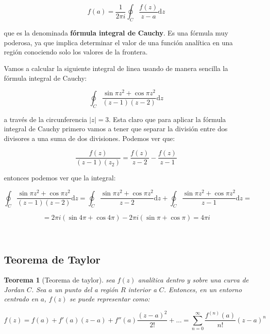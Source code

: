 \documentclass[12pt,a4paper]{book}
\newcommand{\D}{\mathrm{d}}
\newtheorem{theorem}{Teorema}[section]
\begin{document}
\begin{equation}
f(a) =  \frac{1}{2 \pi i} \oint_C \frac{f(z)}{z-a} \D z
\end{equation}

que es la denominada \textbf{fórmula integral de Cauchy}. Es una fórmula muy poderosa, ya que implica determinar el valor de una función analítica en una región conociendo solo los valores de la frontera. \\



\hrulefill

Vamos a calcular la siguiente integral de linea usando de manera sencilla la fórmula integral de Cauchy:

\begin{equation}
\oint_C  \frac{\sin \pi z^2 + \cos \pi z^2}{(z-1)(z-2)} \D z
\end{equation}

a través de la circunferencia $|z| = 3$. Esta claro que para aplicar la fórmula integral de Cauchy primero vamos a tener que separar la división entre dos divisores a una suma de dos divisiones. Podemos ver que:

$$ \dfrac{f(z)}{(z-1)(z_2)} = \dfrac{f(z)}{z-2} - \dfrac{f(z)}{z-1} $$


entonces podemos ver que la integral:

$$  
\oint_C  \frac{\sin \pi z^2 + \cos \pi z^2}{(z-1)(z-2)} \D z  = 
\oint_C  \frac{\sin \pi z^2 + \cos \pi z^2}{z-2} \D z + 
\oint_C  \frac{\sin \pi z^2 + \cos \pi z^2}{z-1} \D z  = $$

$$ = 2 \pi i (\sin 4\pi + \cos 4\pi) - 2 \pi i (\sin \pi + \cos \pi) = 4 \pi i  $$

\hrulefill \\

\subsection{Teorema de Taylor}

\begin{theorem}[Teorema de taylor]
sea $f(z)$ analítica dentro y sobre una curva de Jordan $C$. Sea $a$ un punto del a región $R$ interior a $C$. Entonces, en un entorno centrado en $a$, $f(z)$ se puede representar como:

$$ f(z) = f(a) + f'(a)(z-a)+f''(a) \dfrac{(z-a)^2}{2!} + \ldots = \sum_{n=0}^\infty \frac{f^{(n)}(a)}{n!} (z-a)^n $$
\end{theorem}
\end{document}
